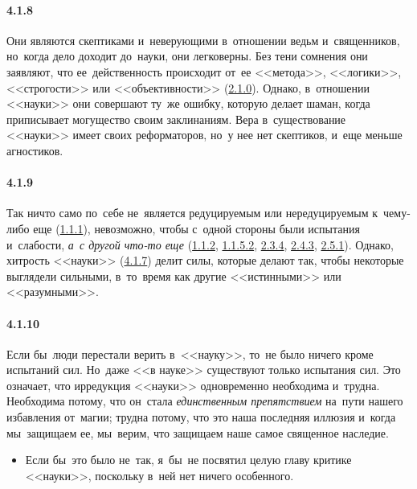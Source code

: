 \paragraph{4.1.8}\hypertarget{par:4.1.8}{} Они являются скептиками и~неверующими в~отношении ведьм и~священников, но~когда дело доходит до~науки, они легковерны. Без тени сомнения они заявляют, что ее~действенность происходит от~ее <<метода>>, <<логики>>, <<строгости>> или <<объективности>> (\hyperlink{par:2.1.0}{2.1.0}). Однако, в~отношении <<науки>> они совершают ту~же ошибку, которую делает шаман, когда приписывает могущество своим заклинаниям. Вера в~существование <<науки>> имеет своих реформаторов, но~у нее нет скептиков, и~еще меньше агностиков.


\paragraph{4.1.9}\hypertarget{par:4.1.9}{} Так ничто само по~себе не~является редуцируемым или нередуцируемым к~чему-либо еще (\hyperlink{par:1.1.1}{1.1.1}), невозможно, чтобы с~одной стороны были испытания и~слабости, {\itshape а~с другой что-то еще} (\hyperlink{par:1.1.2}{1.1.2}, \hyperlink{par:1.1.5.2}{1.1.5.2}, \hyperlink{par:2.3.4}{2.3.4}, \hyperlink{par:2.4.3}{2.4.3}, \hyperlink{par:2.5.1}{2.5.1}). Однако, хитрость <<науки>> (\hyperlink{par:4.1.7}{4.1.7}) делит силы, которые делают так, чтобы некоторые выглядели сильными, в~то~время как другие <<истинными>> или <<разумными>>.

\paragraph{4.1.10}\hypertarget{par:4.1.10}{}Если бы~люди перестали верить в~<<науку>>, то~не было ничего кроме испытаний сил. Но~даже <<в науке>> существуют только испытания сил. Это означает, что ирредукция <<науки>> одновременно необходима и~трудна. Необходима потому, что он~стала {\itshape единственным препятствием} на~пути нашего избавления от~магии; трудна потому, что это наша последняя иллюзия и~когда мы~защищаем ее, мы~верим, что защищаем наше самое священное наследие. 
	\begin{itemize}
	\item 
	Если бы~это было не~так, я~бы~не посвятил целую главу критике <<науки>>, поскольку в~ней нет ничего особенного. 
	\end{itemize}	 




